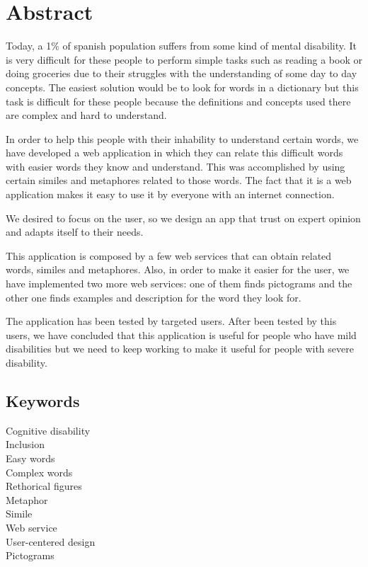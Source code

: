 \chapter*{Abstract}

Today, a 1\% of spanish population suffers from some kind of mental disability. It is very difficult for these people to perform simple tasks such as reading a book or doing groceries due to their struggles with the understanding of some day to day concepts. The easiest solution would be to look for words in a dictionary but this task is difficult for these people because the definitions and concepts used there are complex and hard to understand.

In order to help this people with their inhability to understand certain words, we have developed a web application in which they can relate this difficult words with easier words they know and understand. This was accomplished by using certain similes and metaphores related to those words. The fact that it is a web application makes it easy to use it by everyone with an internet connection.

We desired to focus on the user, so we design an app that trust on expert opinion and adapts itself to their needs.

This application is composed by a few web services that can obtain related words, similes and metaphores. Also, in order to  make it easier for the user, we have implemented two more web services: one of them finds pictograms and the other one finds examples and description for the word they look for.

The application has been tested by targeted users. After been tested by this users, we have concluded that this application is useful for people who have mild disabilities but we need to keep working to make it useful for people with severe disability.


\section*{Keywords}

\noindent Cognitive disability\\
\noindent Inclusion\\
\noindent Easy words\\
\noindent Complex words\\
\noindent Rethorical figures\\
\noindent Metaphor\\
\noindent Simile\\
\noindent Web service\\
\noindent User-centered design\\
\noindent Pictograms\\



